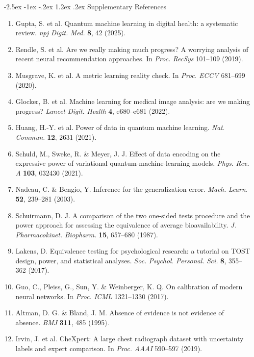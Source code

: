 \documentclass[10pt,a4paper]{article}
\makeatletter
\renewcommand{\section}{\@startsection{section}{1}{\z@}%
  {-2.5ex \@plus -1ex \@minus -.2ex}%
  {1.2ex \@plus.2ex}%
  {\normalfont\Large\sffamily\bfseries\color{naturedark}}}
\makeatother
\begin{document}
\section{Supplementary References}
\begin{enumerate}
  \small
  \setlength{\itemsep}{1pt}
  \item Gupta, S. et al. Quantum machine learning in digital health: a systematic review. \textit{npj Digit. Med.} \textbf{8}, 42 (2025).
  \item Rendle, S. et al. Are we really making much progress? A worrying analysis of recent neural recommendation approaches. In \textit{Proc. RecSys} 101--109 (2019).
  \item Musgrave, K. et al. A metric learning reality check. In \textit{Proc. ECCV} 681--699 (2020).
  \item Glocker, B. et al. Machine learning for medical image analysis: are we making progress? \textit{Lancet Digit. Health} \textbf{4}, e680--e681 (2022).
  \item Huang, H.-Y. et al. Power of data in quantum machine learning. \textit{Nat. Commun.} \textbf{12}, 2631 (2021).
  \item Schuld, M., Sweke, R. \& Meyer, J. J. Effect of data encoding on the expressive power of variational quantum-machine-learning models. \textit{Phys. Rev. A} \textbf{103}, 032430 (2021).
  \item Nadeau, C. \& Bengio, Y. Inference for the generalization error. \textit{Mach. Learn.} \textbf{52}, 239--281 (2003).
  \item Schuirmann, D. J. A comparison of the two one-sided tests procedure and the power approach for assessing the equivalence of average bioavailability. \textit{J. Pharmacokinet. Biopharm.} \textbf{15}, 657--680 (1987).
  \item Lakens, D. Equivalence testing for psychological research: a tutorial on TOST design, power, and statistical analyses. \textit{Soc. Psychol. Personal. Sci.} \textbf{8}, 355--362 (2017).
  \item Guo, C., Pleiss, G., Sun, Y. \& Weinberger, K. Q. On calibration of modern neural networks. In \textit{Proc. ICML} 1321--1330 (2017).
  \item Altman, D. G. \& Bland, J. M. Absence of evidence is not evidence of absence. \textit{BMJ} \textbf{311}, 485 (1995).
  \item Irvin, J. et al. CheXpert: A large chest radiograph dataset with uncertainty labels and expert comparison. In \textit{Proc. AAAI} 590--597 (2019).

\end{enumerate}
\end{document}

